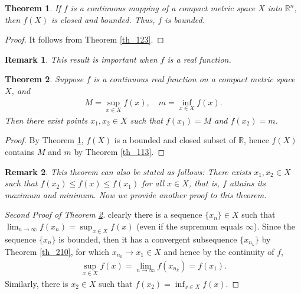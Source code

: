 \documentclass[10pt]{book}
\newtheorem{theorem}{Theorem}[chapter]
\newtheorem{remark}{Remark}[chapter]
\theoremstyle{definition}
\numberwithin{equation}{chapter}
\begin{document}
\medskip

\begin{theorem}\label{th_310}
If $f$ is a continuous mapping of a compact metric space $X$ into $\mathbb{R}^n$, then $f(X)$ is closed and bounded. Thus, $f$ is bounded.
\end{theorem}
\begin{proof}
It follows from Theorem \ref{th_123}.
\end{proof}

\begin{remark}
This result is important when $f$ is a real function.
\end{remark}

\medskip

\begin{theorem}\label{th_311}
Suppose $f$ is a continuous real function on a compact metric space $X$, and
\begin{align*}
    M = \sup_{x\in X} f(x), \quad m = \inf_{x\in X} f(x).
\end{align*}
Then there exist points $x_1, x_2 \in X$ such that $f(x_1) = M$ and $f(x_2) = m$.
\end{theorem}
\begin{proof}
By Theorem \ref{th_310}, $f(X)$ is a bounded and closed subset of $\mathbb{R}$, hence $f(X)$ contains $M$ and $m$ by Theorem \ref{th_113}.
\end{proof}

\begin{remark}
This theorem can also be stated as follows: There exists $x_1, x_2 \in X$ such that $f(x_2) \leq f(x) \leq f(x_1)$ for all $x \in X$, that is, $f$ attains its maximum and minimum. Now we provide another proof to this theorem.
\end{remark}

\medskip

\begin{proof}[Second Proof of Theorem \ref{th_311}]
clearly there is a sequence $\{x_n\} \in X$ such that $\lim_{n\to\infty} f(x_n) = \sup_{x\in X} f(x)$ (even if the supremum equals $\infty$).  Since the sequence $\{x_n\}$ is bounded, then it has a convergent subsequence $\{x_{n_k}\}$ by Theorem \ref{th_210}, for which $x_{n_k} \to x_1 \in X$ and hence by the continuity of $f$,
\begin{align*}
    \sup_{x \in X} f(x) = \lim_{n\to\infty} f(x_{n_k}) = f(x_1).
\end{align*}
Similarly, there is $x_2 \in X$ such that $f(x_2) = \inf_{x\in X} f(x)$. 
\end{proof}
\end{document}
